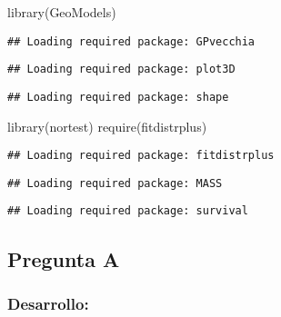 \documentclass[
]{article}
\newenvironment{Shaded}{\begin{snugshade}}{\end{snugshade}}
\newcommand{\FunctionTok}[1]{\textcolor[rgb]{0.00,0.00,0.00}{#1}}
\newcommand{\NormalTok}[1]{#1}
\begin{document}
\begin{Shaded}
\begin{Highlighting}[]
\FunctionTok{library}\NormalTok{(GeoModels)}
\end{Highlighting}
\end{Shaded}

\begin{verbatim}
## Loading required package: GPvecchia
\end{verbatim}

\begin{verbatim}
## Loading required package: plot3D
\end{verbatim}

\begin{verbatim}
## Loading required package: shape
\end{verbatim}

\begin{Shaded}
\begin{Highlighting}[]
\FunctionTok{library}\NormalTok{(nortest)}
\FunctionTok{require}\NormalTok{(fitdistrplus)}
\end{Highlighting}
\end{Shaded}

\begin{verbatim}
## Loading required package: fitdistrplus
\end{verbatim}

\begin{verbatim}
## Loading required package: MASS
\end{verbatim}

\begin{verbatim}
## Loading required package: survival
\end{verbatim}

\hypertarget{pregunta-a}{%
\subsection{Pregunta A}\label{pregunta-a}}

\hypertarget{desarrollo}{%
\subsubsection{Desarrollo:}\label{desarrollo}}
\end{document}
